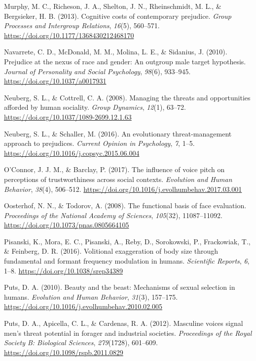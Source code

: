 \documentclass[
  english,
  man]{apa6}
\begin{document}
\leavevmode\hypertarget{ref-Murphy2013}{}%
Murphy, M. C., Richeson, J. A., Shelton, J. N., Rheinschmidt, M. L., \& Bergsieker, H. B. (2013). Cognitive costs of contemporary prejudice. \emph{Group Processes and Intergroup Relations}, \emph{16}(5), 560--571. \url{https://doi.org/10.1177/1368430212468170}

\leavevmode\hypertarget{ref-Navarrete2010}{}%
Navarrete, C. D., McDonald, M. M., Molina, L. E., \& Sidanius, J. (2010). Prejudice at the nexus of race and gender: An outgroup male target hypothesis. \emph{Journal of Personality and Social Psychology}, \emph{98}(6), 933--945. \url{https://doi.org/10.1037/a0017931}

\leavevmode\hypertarget{ref-Neuberg2008}{}%
Neuberg, S. L., \& Cottrell, C. A. (2008). Managing the threats and opportunities afforded by human sociality. \emph{Group Dynamics}, \emph{12}(1), 63--72. \url{https://doi.org/10.1037/1089-2699.12.1.63}

\leavevmode\hypertarget{ref-Neuberg2016}{}%
Neuberg, S. L., \& Schaller, M. (2016). An evolutionary threat-management approach to prejudices. \emph{Current Opinion in Psychology}, \emph{7}, 1--5. \url{https://doi.org/10.1016/j.copsyc.2015.06.004}

\leavevmode\hypertarget{ref-OConnor2017}{}%
O'Connor, J. J. M., \& Barclay, P. (2017). The influence of voice pitch on perceptions of trustworthiness across social contexts. \emph{Evolution and Human Behavior}, \emph{38}(4), 506--512. \url{https://doi.org/10.1016/j.evolhumbehav.2017.03.001}

\leavevmode\hypertarget{ref-Oosterhof2008}{}%
Oosterhof, N. N., \& Todorov, A. (2008). The functional basis of face evaluation. \emph{Proceedings of the National Academy of Sciences}, \emph{105}(32), 11087--11092. \url{https://doi.org/10.1073/pnas.0805664105}

\leavevmode\hypertarget{ref-Pisanski2016}{}%
Pisanski, K., Mora, E. C., Pisanski, A., Reby, D., Sorokowski, P., Frackowiak, T., \& Feinberg, D. R. (2016). Volitional exaggeration of body size through fundamental and formant frequency modulation in humans. \emph{Scientific Reports}, \emph{6}, 1--8. \url{https://doi.org/10.1038/srep34389}

\leavevmode\hypertarget{ref-Puts2010}{}%
Puts, D. A. (2010). Beauty and the beast: Mechanisms of sexual selection in humans. \emph{Evolution and Human Behavior}, \emph{31}(3), 157--175. \url{https://doi.org/10.1016/j.evolhumbehav.2010.02.005}

\leavevmode\hypertarget{ref-Puts2012}{}%
Puts, D. A., Apicella, C. L., \& Cardenas, R. A. (2012). Masculine voices signal men's threat potential in forager and industrial societies. \emph{Proceedings of the Royal Society B: Biological Sciences}, \emph{279}(1728), 601--609. \url{https://doi.org/10.1098/rspb.2011.0829}
\end{document}
